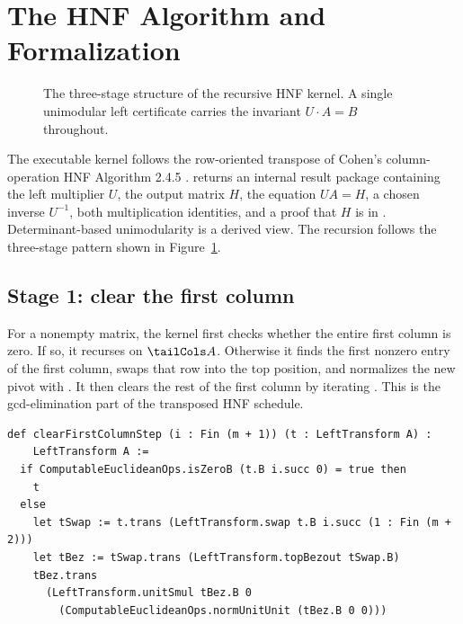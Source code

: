 \section{The HNF Algorithm and Formalization}
\label{sec:algorithm}

\begin{figure}[t]
  \centering
  
  \caption{The three-stage structure of the recursive HNF kernel. A single
  unimodular left certificate carries the invariant \(U \cdot A = B\)
  throughout.}
  \label{fig:hnf-pipeline}
\end{figure}

The executable kernel follows the row-oriented transpose of Cohen's
column-operation HNF Algorithm 2.4.5 \citep[pp. 68--69]{cohen1993}.
 returns an internal
result package containing the left multiplier \(U\), the output matrix \(H\), the
equation \(U A = H\), a chosen inverse \(U^{-1}\), both multiplication
identities, and a proof that \(H\) is in
. Determinant-based unimodularity is a derived
view. The recursion follows the three-stage pattern shown in
Figure~\ref{fig:hnf-pipeline}.

\subsection{Stage 1: clear the first column}

For a nonempty matrix, the kernel first checks whether the entire first column is
zero. If so, it recurses on \(\tailCols A\). Otherwise it finds the first nonzero
entry of the first column, swaps that row into the top position, and normalizes
the new pivot with . It then clears the rest of the first column
by iterating . This is the gcd-elimination part of
the transposed HNF schedule.

\begin{lstlisting}[style=leanstyle,caption={The local first-column elimination step.},label={lst:clearstep}]
def clearFirstColumnStep (i : Fin (m + 1)) (t : LeftTransform A) :
    LeftTransform A :=
  if ComputableEuclideanOps.isZeroB (t.B i.succ 0) = true then
    t
  else
    let tSwap := t.trans (LeftTransform.swap t.B i.succ (1 : Fin (m + 2)))
    let tBez := tSwap.trans (LeftTransform.topBezout tSwap.B)
    tBez.trans
      (LeftTransform.unitSmul tBez.B 0
        (ComputableEuclideanOps.normUnitUnit (tBez.B 0 0)))
\end{lstlisting}


